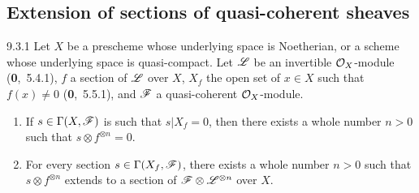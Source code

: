 \documentclass[../main.tex]{subfiles}
\begin{document}
\subsection{Extension of sections of quasi-coherent sheaves}

\begin{cx}[Theorem]{9.3.1}
    Let $X$ be a prescheme whose underlying space is Noetherian, or a scheme whose underlying space is quasi-compact.
    Let $\mathscr{L}$ be an invertible $\mathcal{O}_X$-module {\normalfont(\textbf{0},~5.4.1)}, $f$ a section of $\mathscr{L}$ over $X$, $X_f$ the open set of $x\in X$ such that $f(x)\neq0$ {\normalfont(\textbf{0},~5.5.1)}, and $\mathscr{F}$ a quasi-coherent $\mathcal{O}_X$-module.
    \begin{enumerate}[label=\normalfont(\roman*)]
        \item If $s\in\Gamma(X,\mathscr{F})$ is such that $s|X_f=0$, then there exists a whole number $n>0$ such that $s\otimes f^{\otimes n}=0$.
        \item For every section $s\in\Gamma(X_f,\mathscr{F})$, there exists a whole number $n>0$ such that $s\otimes f^{\otimes n}$ extends to a section of $\mathscr{F}\otimes\mathscr{L}^{\otimes n}$ over $X$.
    \end{enumerate}
\end{cx}
\end{document}
